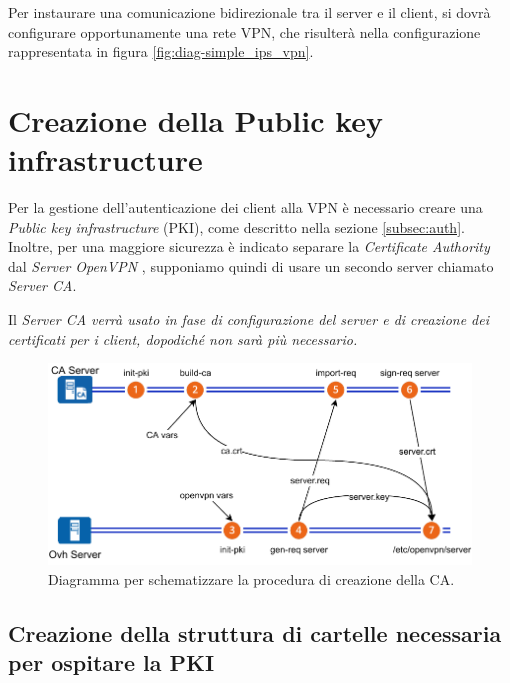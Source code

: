 Per instaurare una comunicazione bidirezionale tra il server e il client, si dovrà configurare opportunamente una rete VPN, che risulterà nella configurazione rappresentata in figura \ref{fig:diag-simple_ips_vpn}.

\section{Creazione della Public key infrastructure}
\label{sec:pki_ca}
\workinprogress

Per la gestione dell'autenticazione dei client alla VPN è necessario creare una \textit{Public key infrastructure} (PKI), come descritto nella sezione \ref{subsec:auth}. Inoltre, per una maggiore sicurezza è indicato separare la \textit{Certificate Authority} dal \textit{Server OpenVPN} \cite{openvpn-as-ca}, supponiamo quindi di usare un secondo server chiamato \textit{Server CA}. 

Il \it{Server CA} verrà usato in fase di configurazione del server e di creazione dei certificati per i client, dopodiché non sarà più necessario.

\begin{figure}[H]
    \centering
    \includegraphics[width=1\linewidth]{immagini/diag-firma_certificato_ca}
    \caption{Diagramma per schematizzare la procedura di creazione della CA.}
    \label{fig:diag-firma_certificato_ca}
\end{figure}


\subsection{Creazione della struttura di cartelle necessaria per ospitare la PKI}

